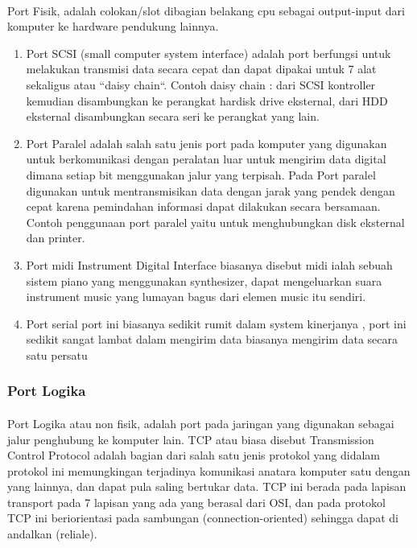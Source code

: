 \paragraph{}
\hspace{1cm}
Port Fisik, adalah colokan/slot dibagian belakang cpu sebagai output-input dari komputer ke hardware pendukung lainnya. \\
\begin{enumerate}
\item Port SCSI (small computer system interface) adalah port berfungsi untuk melakukan transmisi data secara cepat dan dapat dipakai untuk 7 alat sekaligus atau “daisy chain“. Contoh daisy chain : dari SCSI kontroller kemudian disambungkan ke perangkat hardisk drive eksternal, dari HDD eksternal disambungkan secara seri ke perangkat yang lain.
\item Port Paralel adalah  salah satu jenis port pada komputer yang digunakan untuk berkomunikasi dengan peralatan luar untuk mengirim data digital dimana setiap bit menggunakan jalur yang terpisah. Pada Port paralel digunakan untuk mentransmisikan data dengan jarak yang pendek dengan cepat karena pemindahan informasi dapat dilakukan secara bersamaan. Contoh penggunaan port paralel yaitu untuk menghubungkan disk eksternal dan printer.
\item Port midi Instrument Digital Interface biasanya disebut midi ialah sebuah sistem piano yang menggunakan synthesizer, dapat mengeluarkan suara instrument music yang lumayan bagus dari elemen music itu sendiri.
\item Port serial port ini biasanya sedikit rumit dalam system kinerjanya , port ini sedikit sangat lambat dalam mengirim data biasanya mengirim data secara satu persatu 
\end{enumerate}
\subsubsection {Port Logika}

\paragraph{}
\hspace{1cm} 
Port Logika atau non fisik, adalah port pada jaringan yang digunakan sebagai jalur penghubung ke komputer lain. TCP atau biasa disebut Transmission Control Protocol adalah bagian dari salah satu jenis protokol yang didalam protokol ini memungkingan terjadinya komunikasi anatara komputer satu dengan yang lainnya, dan dapat pula saling bertukar data. TCP ini berada pada lapisan transport pada 7 lapisan yang ada yang berasal dari OSI, dan pada protokol TCP ini beriorientasi pada sambungan (connection-oriented) sehingga dapat di andalkan (reliale).

